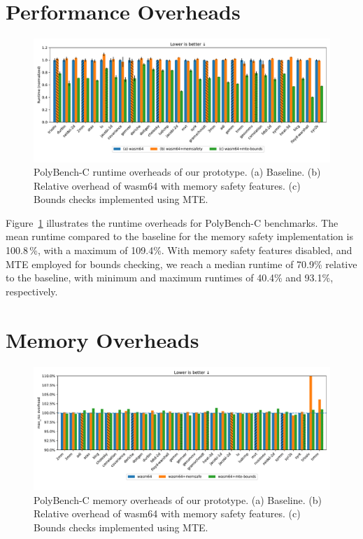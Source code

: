 \section{Performance Overheads}

\begin{figure}[ht]
    \centering
    \includegraphics[width=\textwidth]{./plots/runtimes}
    \caption{{PolyBench-C runtime overheads of our prototype. (a) Baseline. (b) Relative overhead of wasm64 with memory safety features. (c) Bounds checks implemented using MTE.}{}}
    \label{fig:runtime_overheads}
\end{figure}

Figure~\ref{fig:runtime_overheads} illustrates the runtime overheads for PolyBench-C benchmarks.
The mean runtime compared to the baseline for the memory safety implementation is 100.8\,\%, with a maximum of 109.4\%.
With memory safety features disabled, and MTE employed for bounds checking, we reach a median runtime of 70.9\% relative to the baseline, with minimum and maximum runtimes of 40.4\% and 93.1\%, respectively.



\section{Memory Overheads}\label{sec:memory-overheads}

\begin{figure}[ht]
    \centering
    \includegraphics[width=\textwidth]{./plots/mem-overhead}
    \caption{{PolyBench-C memory overheads of our prototype. (a) Baseline. (b) Relative overhead of wasm64 with memory safety features. (c) Bounds checks implemented using MTE.}{}}
    \label{fig:memory_overheads}
\end{figure}

